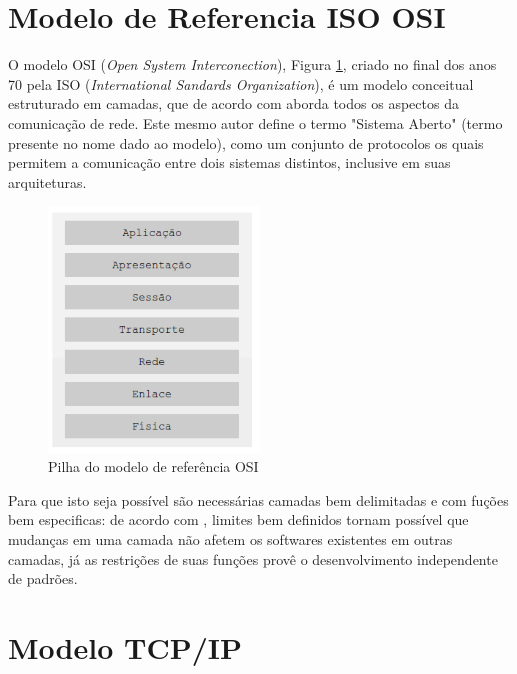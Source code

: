 	 
\section{Modelo de Referencia ISO OSI}

O modelo OSI (\textit{Open System Interconection}), Figura \ref{fig:OSI}, criado no final dos anos 70 pela ISO (\textit{International Sandards Organization}), é um modelo conceitual estruturado em camadas, que de acordo com  aborda todos os aspectos da comunicação de rede. Este mesmo autor define o termo "Sistema Aberto" (termo presente no nome dado ao modelo), como um conjunto de protocolos os quais permitem a comunicação entre dois sistemas distintos, inclusive em suas arquiteturas. 

\begin{figure}[H]
	\centering
    \includegraphics[width=0.5\textwidth]{04-figuras/OSI.png}
    \caption{Pilha do modelo de referência OSI}
    \label{fig:OSI}
\end{figure} 


Para que isto seja possível são necessárias camadas bem delimitadas e com fuç\~oes bem especificas: de acordo com , limites bem definidos tornam possível que mudanças em uma camada não afetem os softwares existentes em outras camadas, já as restrições de suas funções provê o desenvolvimento independente de padrões.




\section{Modelo TCP/IP}

